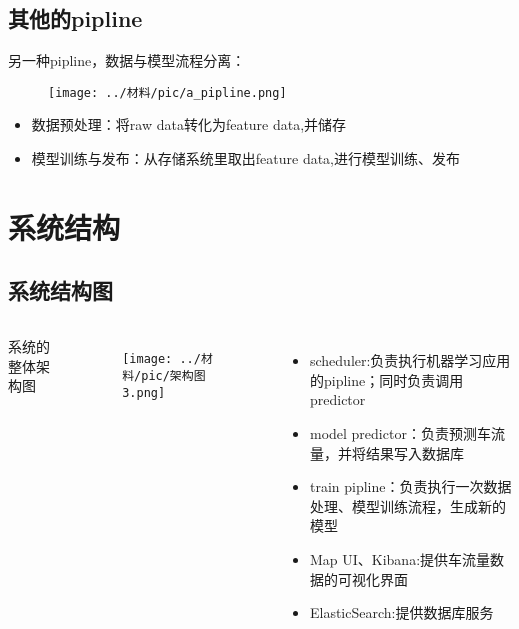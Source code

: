 \documentclass[notheorems, aspectratio=1610]{beamer}
\begin{document}
\subsection{其他的pipline}
\begin{frame}
    另一种pipline，数据与模型流程分离：
    \begin{figure}[h] %
        \centering %
        \texttt{[image: ../材料/pic/a\_pipline.png]} %
    \end{figure}%
    \begin{itemize}
        \item 数据预处理：将raw data转化为feature data,并储存
        \item 模型训练与发布：从存储系统里取出feature data,进行模型训练、发布
    \end{itemize}
\end{frame}
\section{系统结构}
\subsection{系统结构图}
\begin{frame}
    \begin{columns}
        \large 系统的整体架构图
        \begin{figure}[h] %
            \flushleft %
            \texttt{[image: ../材料/pic/架构图3.png]} %
        \end{figure}%
        \begin{itemize}
            \item scheduler:负责执行机器学习应用的pipline；同时负责调用predictor
            \item model predictor：负责预测车流量，并将结果写入数据库
            \item train pipline：负责执行一次数据处理、模型训练流程，生成新的模型
            \item Map UI、Kibana:提供车流量数据的可视化界面
            \item ElasticSearch:提供数据库服务
        \end{itemize}
        
    \end{columns}
    
\end{frame}
\end{document}
